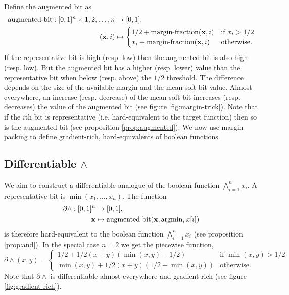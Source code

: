 \documentclass{article} %
\begin{document}
Define the augmented bit as
\begin{equation*}
\begin{aligned}
\operatorname{augmented-bit}: [0,1]^{n} \times 1,2,\dots,n &\to [0,1],\\
({\bf x}, i) &\mapsto 
\begin{cases}
1/2 + \operatorname{margin-fraction}({\bf x}, i) & \text{if } x_{i} > 1/2 \\
x_{i} + \operatorname{margin-fraction}({\bf x}, i) & \text{otherwise.}
\end{cases}
\end{aligned}
\end{equation*}
If the representative bit is high (resp. low) then the augmented bit is also high (resp. low). 
But the augmented bit has a higher (resp. lower) value than the representative bit when below (resp. above) the $1/2$ threshold. The difference depends on the size of the available margin and the mean soft-bit value. Almost everywhere, an increase (resp. decrease) of the mean soft-bit increases (resp. decreases) the value of the augmented bit (see figure \ref{fig:margin-trick}). Note that if the $i$th bit is representative (i.e. hard-equivalent to the target function) then so is the augmented bit (see proposition \ref{prop:augmented}). We now use margin packing to define gradient-rich, hard-equivalents of boolean functions.

\subsection{Differentiable $\wedge$}

We aim to construct a differentiable analogue of the boolean function $\bigwedge_{i=1}^{n} x_i$. A representative bit is $\operatorname{min}(x_{1},\dots,x_{n})$. The function
\begin{equation*}
\begin{aligned}
\partial \wedge: [0,1]^{n} &\to [0,1], \\
{\bf x} &\mapsto \operatorname{augmented-bit}({\bf x}, \operatorname{argmin}\limits_{i} x[i])
\end{aligned}
\end{equation*}
is therefore hard-equivalent to the boolean function $\bigwedge_{i=1}^{n} x_i$ (see proposition \ref{prop:and}). In the special case $n=2$ we get the piecewise function,
\begin{equation*}
\partial\!\wedge\!(x, y) =
	\begin{cases}
	1/2 + 1/2(x + y)(\operatorname{min}(x,y) - 1/2) & \text{if } \operatorname{min}(x,y) > 1/2 \\
	\operatorname{min}(x,y) + 1/2(x + y)(1/2 - \operatorname{min}(x,y)) & \text{otherwise.}
	\end{cases}
\end{equation*}
Note that $\partial \wedge$ is differentiable almost everywhere and gradient-rich (see figure \ref{fig:gradient-rich}).
\end{document}
